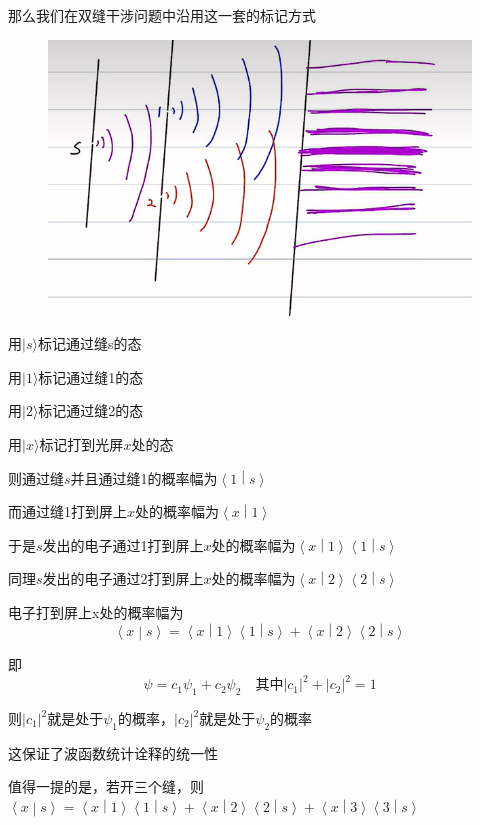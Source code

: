 \documentclass[lang=cn,15pt]{elegantbook}
\begin{document}
那么我们在双缝干涉问题中沿用这一套的标记方式
\begin{figure}[H]
	\centering
	\includegraphics[width=0.7\linewidth]{figure/screenshot008}
\end{figure}

用$|s\rangle $标记通过缝s的态

用$|1\rangle $标记通过缝1的态

用$|2\rangle $标记通过缝2的态

用$|x\rangle $标记打到光屏$x$处的态

则通过缝$s$并且通过缝1的概率幅为$\left< 1 \middle| s \right>$

而通过缝1打到屏上$x$处的概率幅为$\left< x \middle| 1 \right>$

于是$s$发出的电子通过1打到屏上$x$处的概率幅为$\left< x \middle| 1 \right>$$\left< 1 \middle| s \right>$

同理$s$发出的电子通过2打到屏上$x$处的概率幅为$\left< x \middle| 2 \right>$$\left< 2 \middle| s \right>$

电子打到屏上x处的概率幅为
\begin{equation}
	\left< x \middle| s \right>	=\left< x \middle| 1 \right>\left< 1 \middle| s \right>+\left< x \middle| 2 \right>\left< 2 \middle| s \right>
\end{equation}

即
\begin{equation}
	\psi=c_1\psi_1+c_2\psi_2\quad\text{其中}|c_1|^2+|c_2|^2=1
\end{equation}

则$|c_1|^2$就是处于$\psi_1$的概率，$|c_2|^2$就是处于$\psi_2$的概率

这保证了波函数统计诠释的统一性

值得一提的是，若开三个缝，则$	\left< x \middle| s \right>	=\left< x \middle| 1 \right>\left< 1 \middle| s \right>+\left< x \middle| 2 \right>\left< 2 \middle| s \right>+\left< x \middle| 3 \right>\left< 3 \middle| s \right>$
\end{document}
